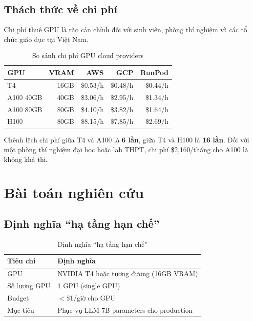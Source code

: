 \documentclass[12pt,a4paper]{report}
\begin{document}
\subsection{Thách thức về chi phí}

Chi phí thuê GPU là rào cản chính đối với sinh viên, phòng thí nghiệm và các tổ chức giáo dục tại Việt Nam.

\begin{table}[h]
\centering
\caption{So sánh chi phí GPU cloud providers}
\label{tab:gpu-cost}
\begin{tabular}{lrrrr}
\toprule
\textbf{GPU} & \textbf{VRAM} & \textbf{AWS} & \textbf{GCP} & \textbf{RunPod} \\
\midrule
T4 & 16GB & \$0.53/h & \$0.48/h & \$0.44/h \\
A100 40GB & 40GB & \$3.06/h & \$2.95/h & \$1.34/h \\
A100 80GB & 80GB & \$4.10/h & \$3.82/h & \$1.64/h \\
H100 & 80GB & \$8.15/h & \$7.85/h & \$2.69/h \\
\bottomrule
\end{tabular}
\end{table}

Chênh lệch chi phí giữa T4 và A100 là \textbf{6 lần}, giữa T4 và H100 là \textbf{16 lần}. Đối với một phòng thí nghiệm đại học hoặc lab THPT, chi phí \$2,160/tháng cho A100 là không khả thi.

\section{Bài toán nghiên cứu}

\subsection{Định nghĩa ``hạ tầng hạn chế''}

\begin{table}[h]
\centering
\caption{Định nghĩa ``hạ tầng hạn chế''}
\label{tab:limited-infra}
\begin{tabular}{lp{8cm}}
\toprule
\textbf{Tiêu chí} & \textbf{Định nghĩa} \\
\midrule
GPU & NVIDIA T4 hoặc tương đương (16GB VRAM) \\
Số lượng GPU & 1 GPU (single GPU) \\
Budget & $<$\$1/giờ cho GPU \\
Mục tiêu & Phục vụ LLM 7B parameters cho production \\
\bottomrule
\end{tabular}
\end{table}
\end{document}
